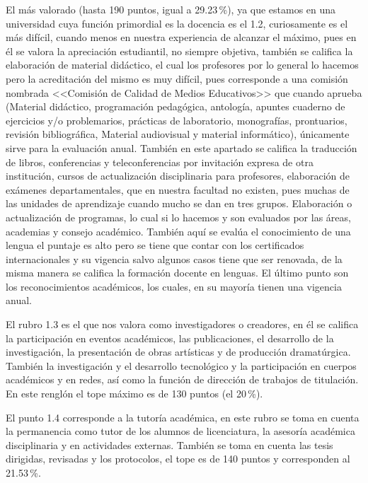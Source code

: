 El más valorado (hasta 190 puntos, igual a 29.23\,\%), ya que estamos en una
universidad cuya función primordial es la docencia es el 1.2, curiosamente
es el más difícil, cuando menos en nuestra experiencia de alcanzar el
máximo, pues en él se valora la apreciación estudiantil, no siempre
objetiva, también se califica la elaboración de material didáctico, el cual
los profesores por lo general lo hacemos pero la acreditación del mismo es
muy difícil, pues corresponde a una comisión nombrada <<Comisión de Calidad
de Medios Educativos>> que cuando aprueba (Material didáctico, programación
pedagógica, antología, apuntes cuaderno de ejercicios y\slash{}o problemarios,
prácticas de laboratorio, monografías,  prontuarios, revisión
bibliográfica, Material audiovisual y material informático), únicamente
sirve para la evaluación anual. También en este apartado se califica la
traducción de libros, conferencias y teleconferencias por invitación
expresa de otra institución, cursos de actualización disciplinaria para
profesores, elaboración de exámenes departamentales, que en nuestra
facultad no existen, pues muchas de las unidades de aprendizaje cuando
mucho se dan en tres grupos. Elaboración o actualización de programas, lo
cual si lo hacemos y son evaluados por las áreas, academias y consejo
académico. También aquí se evalúa el conocimiento de una lengua el puntaje
es alto pero se tiene que contar con los certificados internacionales y su
vigencia salvo algunos casos tiene que ser renovada, de la misma manera se
califica la formación docente en lenguas. El último punto son los
reconocimientos académicos,  los cuales, en su mayoría tienen una vigencia
anual. 


El rubro 1.3 es el que nos valora como investigadores o creadores, en él se
califica  la participación en eventos académicos, las publicaciones, el
desarrollo de la investigación, la presentación de obras artísticas y de
producción dramatúrgica. También la investigación y el desarrollo tecnológico y la
participación en cuerpos académicos y en redes, así como la  función de
dirección de trabajos de titulación. En este renglón el tope máximo es de 130 puntos
(el 20\,\%).


El punto 1.4 corresponde a la tutoría académica, en este rubro se toma en
cuenta la permanencia como tutor de los alumnos de licenciatura, la
asesoría académica disciplinaria y en actividades externas. También se toma
en cuenta las tesis dirigidas, revisadas y los protocolos, el tope es de
140 puntos y corresponden al  21.53\,\%.


